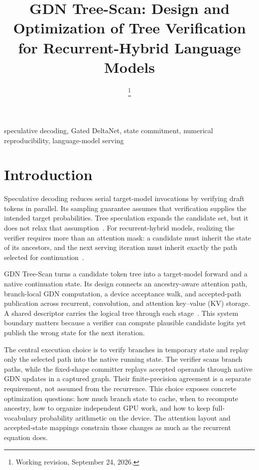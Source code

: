 \documentclass[conference]{IEEEtran}
\newcommand{\sys}{GDN Tree-Scan}
\begin{document}
\title{GDN Tree-Scan: Design and Optimization of Tree Verification for Recurrent-Hybrid Language Models}
\author{
\thanks{Working revision, September 24, 2026.}}
\maketitle

\begin{IEEEkeywords}
speculative decoding, Gated DeltaNet, state commitment, numerical reproducibility, language-model serving
\end{IEEEkeywords}

\section{Introduction}
Speculative decoding reduces serial target-model invocations by verifying draft tokens in parallel. Its sampling guarantee assumes that verification supplies the intended target probabilities. Tree speculation expands the candidate set, but it does not relax that assumption~\cite{leviathan2023fast,chen2023sampling,miao2023specinfer}. For recurrent-hybrid models, realizing the verifier requires more than an attention mask: a candidate must inherit the state of its ancestors, and the next serving iteration must inherit exactly the path selected for continuation~\cite{yang2024gated,wu2025stree}.

\sys{} turns a candidate token tree into a target-model forward and a native continuation state. Its design connects an ancestry-aware attention path, branch-local GDN computation, a device acceptance walk, and accepted-path publication across recurrent, convolution, and attention key--value (KV) storage. A shared descriptor carries the logical tree through each stage~\cite{lumo2026archive,lumo2026stateless}. This system boundary matters because a verifier can compute plausible candidate logits yet publish the wrong state for the next iteration.

The central execution choice is to verify branches in temporary state and replay only the selected path into the native running state. The verifier scans branch paths, while the fixed-shape committer replays accepted operands through native GDN updates in a captured graph. Their finite-precision agreement is a separate requirement, not assumed from the recurrence. This choice exposes concrete optimization questions: how much branch state to cache, when to recompute ancestry, how to organize independent GPU work, and how to keep full-vocabulary probability arithmetic on the device. The attention layout and accepted-state mappings constrain those changes as much as the recurrent equation does.
\end{document}
